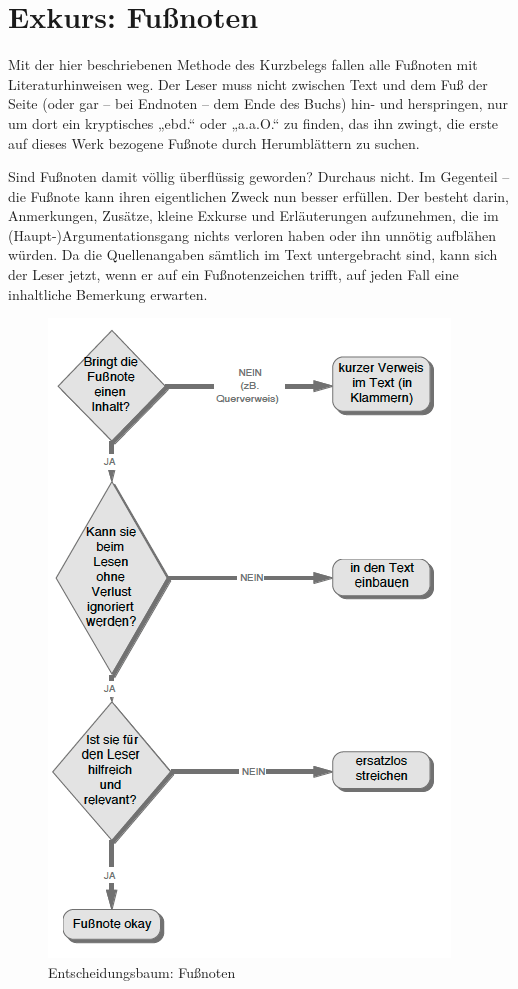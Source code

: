 \documentclass[]{book}
\theoremstyle{definition}
\theoremstyle{definition}
\theoremstyle{definition}
\theoremstyle{remark}
\begin{document}
\section{Exkurs: Fußnoten}\label{exkurs-funoten}

Mit der hier beschriebenen Methode des Kurzbelegs fallen alle Fußnoten
mit Literaturhinweisen weg. Der Leser muss nicht zwischen Text und dem
Fuß der Seite (oder gar -- bei Endnoten -- dem Ende des Buchs) hin- und
herspringen, nur um dort ein kryptisches „ebd.`` oder „a.a.O.`` zu
finden, das ihn zwingt, die erste auf dieses Werk bezogene Fußnote durch
Herumblättern zu suchen.

Sind Fußnoten damit völlig überflüssig geworden? Durchaus nicht. Im
Gegenteil -- die Fußnote kann ihren eigentlichen Zweck nun besser
erfüllen. Der besteht darin, Anmerkungen, Zusätze, kleine Exkurse und
Erläuterungen aufzunehmen, die im (Haupt-)Argumentationsgang nichts
verloren haben oder ihn unnötig aufblähen würden. Da die Quellenangaben
sämtlich im Text untergebracht sind, kann sich der Leser jetzt, wenn er
auf ein Fußnotenzeichen trifft, auf jeden Fall eine inhaltliche
Bemerkung erwarten.

\begin{figure}

{\centering \includegraphics{images/zitieren-fussnote-min} 

}

\caption{Entscheidungsbaum: Fußnoten}\label{fig:unnamed-chunk-23}
\end{figure}
\end{document}
